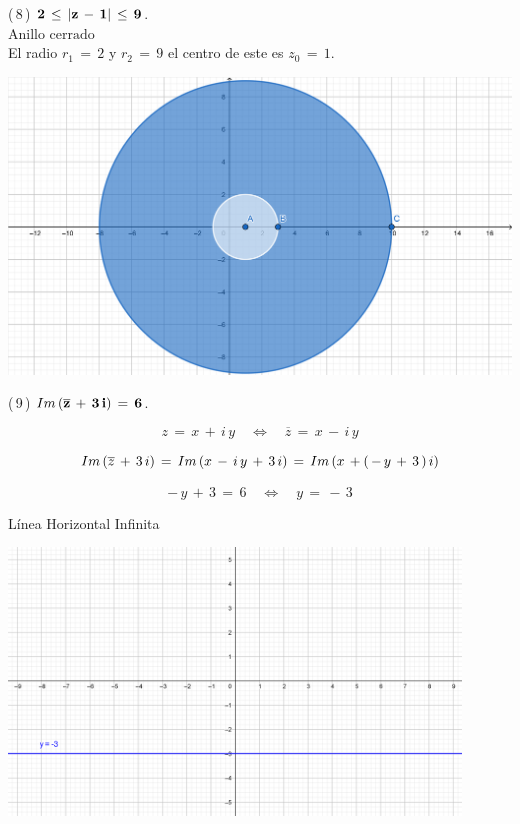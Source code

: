 \documentclass[a4paper,11pt,openany]{book}
\begin{document}
\textcolor{ao(english)}{(\,8\,)} $\bf{2\,\leq\,|z\,-\,1|\,\leq\,9}$.\\

$\text{Anillo cerrado}$\\

El radio $r_{1}\,=\,2$ y $r_{2}\,=\,9$ el centro de este es $z_{0}\,=\,1$.

\begin{center}
    \includegraphics[width=15cm]{Gra-Ej-8.png}
\end{center}

\textcolor{ao(english)}{(\,9\,)} $\bf{\mathnormal{Im}\,(\overline{z}\,+\,3\,i)\,=\,6}$.

$$z\,=\,x\,+\,i\,y \quad\iff\quad \overline{z}\,=\,x\,-\,i\,y $$

$$\mathnormal{Im}\,(\overline{z}\,+\,3\,i)\,=\,\mathnormal{Im}\,(x\,-\,i\,y\,+\,3\,i)\,=\,\mathnormal{Im}\,(x\,+(\,-\,y\,+\,3\,)\,i)$$

$$-\,y\,+\,3\,=\,6 \quad\iff\quad y\,=\,-\,3$$

Línea Horizontal Infinita

\begin{center}
    \includegraphics[width=12cm]{Gra-Ej-9.png}
\end{center}
\end{document}
